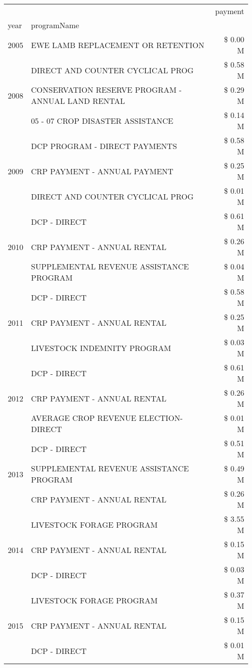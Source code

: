 \begin{tabular}{llr}
\toprule
 &  & payment \\
year & programName &  \\
\midrule
2005 & EWE LAMB REPLACEMENT OR RETENTION & \$ 0.00 M \\
\cline{1-3}
\multirow[t]{3}{*}{2008} & DIRECT AND COUNTER CYCLICAL PROG & \$ 0.58 M \\
 & CONSERVATION RESERVE PROGRAM - ANNUAL LAND RENTAL & \$ 0.29 M \\
 & 05 - 07 CROP DISASTER ASSISTANCE & \$ 0.14 M \\
\cline{1-3}
\multirow[t]{3}{*}{2009} & DCP PROGRAM - DIRECT PAYMENTS & \$ 0.58 M \\
 & CRP PAYMENT - ANNUAL PAYMENT & \$ 0.25 M \\
 & DIRECT AND COUNTER CYCLICAL PROG & \$ 0.01 M \\
\cline{1-3}
\multirow[t]{3}{*}{2010} & DCP - DIRECT & \$ 0.61 M \\
 & CRP PAYMENT - ANNUAL RENTAL & \$ 0.26 M \\
 & SUPPLEMENTAL REVENUE ASSISTANCE PROGRAM & \$ 0.04 M \\
\cline{1-3}
\multirow[t]{3}{*}{2011} & DCP - DIRECT & \$ 0.58 M \\
 & CRP PAYMENT - ANNUAL RENTAL & \$ 0.25 M \\
 & LIVESTOCK INDEMNITY PROGRAM & \$ 0.03 M \\
\cline{1-3}
\multirow[t]{3}{*}{2012} & DCP - DIRECT & \$ 0.61 M \\
 & CRP PAYMENT - ANNUAL RENTAL & \$ 0.26 M \\
 & AVERAGE CROP REVENUE ELECTION-DIRECT & \$ 0.01 M \\
\cline{1-3}
\multirow[t]{3}{*}{2013} & DCP - DIRECT & \$ 0.51 M \\
 & SUPPLEMENTAL REVENUE ASSISTANCE PROGRAM & \$ 0.49 M \\
 & CRP PAYMENT - ANNUAL RENTAL & \$ 0.26 M \\
\cline{1-3}
\multirow[t]{3}{*}{2014} & LIVESTOCK FORAGE PROGRAM & \$ 3.55 M \\
 & CRP PAYMENT - ANNUAL RENTAL & \$ 0.15 M \\
 & DCP - DIRECT & \$ 0.03 M \\
\cline{1-3}
\multirow[t]{3}{*}{2015} & LIVESTOCK FORAGE PROGRAM & \$ 0.37 M \\
 & CRP PAYMENT - ANNUAL RENTAL & \$ 0.15 M \\
 & DCP - DIRECT & \$ 0.01 M \\

\end{tabular}
